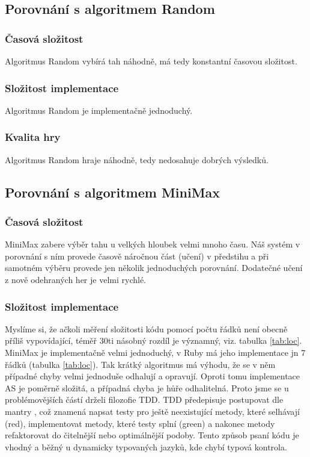 \documentclass[12pt]{article}
\begin{document}
\subsection{Porovnání s algoritmem Random}
\subsubsection{Časová složitost}
Algoritmus Random vybírá tah náhodně, má tedy konstantní časovou složitost.
\subsubsection{Složitost implementace}
Algoritmus Random je implementačně jednoduchý.
\subsubsection{Kvalita hry}
Algoritmus Random hraje náhodně, tedy nedosahuje dobrých výsledků.


\subsection{Porovnání s algoritmem MiniMax}
\subsubsection{Časová složitost}
MiniMax zabere výběr tahu u velkých hloubek velmi mnoho času. Náš systém v porovnání s ním provede časově náročnou část (učení) v předstihu a při samotném výběru provede jen několik jednoduchých porovnání. Dodatečné učení z nově odehraných her je velmi rychlé.

\subsubsection{Složitost implementace}
Myslíme si, že ačkoli měření složitosti kódu pomocí počtu řádků není obecně příliš vypovídající, téměř 30ti násobný rozdíl je významný, viz. tabulka  \ref{tab:loc}.
MiniMax je implementačně velmi jednoduchý, v Ruby má jeho implementace jn 7 řádků (tabulka \ref{tab:loc}). Tak krátký algoritmus má výhodu, že se v něm případné chyby velmi jednoduše odhalují a opravují. Oproti tomu implementace \ac{AS} je poměrně složitá, a případná chyba je hůře odhalitelná. Proto jsme se u problémovějších částí drželi filozofie \ac{TDD}. \ac{TDD} předepisuje postupovat dle mantry , což znamená napsat testy pro ještě neexistující metody, které selhávají (red), implementovat metody, které testy splní (green) a nakonec metody refaktorovat do čitelnější nebo optimálnější podoby. Tento způsob psaní kódu je vhodný a běžný u dynamicky typovaných jazyků, kde chybí typová kontrola.
\end{document}
